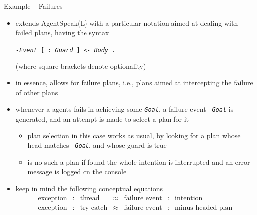 \documentclass[presentation]{beamer}\mode<presentation>{\usetheme{AMSBolognaFC}}
\begin{document}
\begin{frame}[c, allowframebreaks]{Example \theJasonExample{} -- Failures}
    \begin{itemize}
        \item \jason{} extends AgentSpeak(L) with a particular notation aimed at dealing with failed plans, having the syntax 
        \begin{center}
            \texttt{\alert{-}\textit{Event} \alert{[} : \textit{Guard} \alert{]} <- \textit{Body} .}
        \end{center}
        (where square brackets denote optionality)
        
        \vspace{.3cm}
        
        \item in essence, \jason{} allows for failure plans, i.e., plans aimed at intercepting the failure of other plans
        
        \vspace{.3cm}
        
        \item whenever a \jason{} agents fails in achieving some \texttt{\textit{Goal}}, a failure event \texttt{\alert{-}\textit{Goal}} is generated, and an attempt is made to select a plan for it
        \begin{itemize}
            \item plan selection in this case works as usual, by looking for a plan whose head matches \texttt{\alert{-}\textit{Goal}}, and whose guard is true
            \item is no such a plan if found the whole intention is interrupted and an error message is logged on the console
        \end{itemize}
        
        \vspace{.3cm}
        
        \item keep in mind the following conceptual equations
        \[
            \begin{array}{rcccccl}
                \text{exception} & : & \text{thread} & \approx & \text{failure event} & : & \text{intention} 
                \\
                \text{exception} & : & \text{try-catch} & \approx & \text{failure event} & : & \text{minus-headed plan}
            \end{array}
        \]
        

\end{itemize}
\end{frame}
\end{document}
